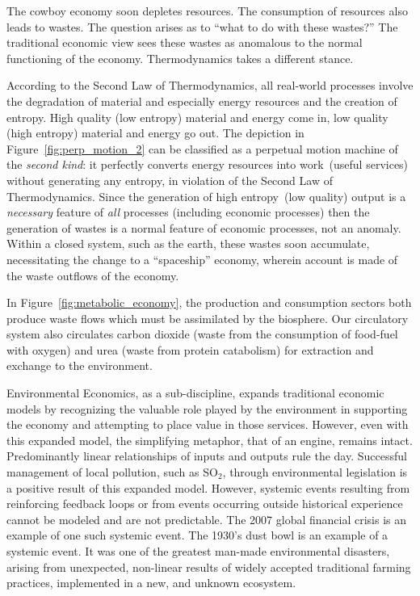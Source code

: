 The cowboy economy soon depletes resources.
The consumption of resources also leads to wastes.
The question arises as to ``what to do with these wastes?''
The traditional economic view sees these wastes as
anomalous to the normal functioning of the economy.\cite{Ayres1969}
Thermodynamics takes a different stance.

According to the Second Law of Thermodynamics,
all real-world processes involve the degradation
of material and especially energy resources
and the creation of entropy.
High quality (low entropy) material and energy come in,
low quality (high entropy) material and energy go out.
The depiction in Figure~\ref{fig:perp_motion_2} 
can be classified as a perpetual motion machine
of the \emph{second kind}:
it perfectly converts energy resources into 
work~(useful services) without generating
any entropy,
in violation of the Second Law of Thermodynamics.
Since the generation of high entropy~(low quality)
output is a \emph{necessary} feature of \emph{all} processes 
(including economic processes)
then the generation of wastes is a normal feature of
economic processes,
not an anomaly.
Within a closed system, such as the earth,
these wastes soon accumulate,
necessitating the change to a ``spaceship'' economy,
wherein account is made of the waste outflows of
the economy.

In Figure~\ref{fig:metabolic_economy},
the production and consumption sectors both produce
waste flows which must be assimilated by the biosphere.
Our circulatory system also circulates carbon dioxide
(waste from the consumption of food-fuel with oxygen)
and urea (waste from protein catabolism) for extraction
and exchange to the environment.

Environmental Economics, as a sub-discipline, 
expands traditional economic models by recognizing the
valuable role played by the environment in supporting the 
economy and attempting to place value in those services.
However, even with this expanded model, 
the simplifying metaphor,
that of an engine,
remains intact. 
Predominantly linear relationships of inputs and outputs rule the day. 
Successful management of  local pollution, such as SO$_2$, 
through environmental legislation
is a positive result of this expanded model.
However, systemic events resulting from reinforcing feedback loops 
or from events occurring outside historical experience 
cannot be modeled and are not predictable. 
The 2007 global financial crisis is an example of one such systemic event.\cite{Economist2010}
The 1930's dust bowl is an example of a systemic event. 
It was one of the greatest man-made environmental disasters, 
arising from unexpected, non-linear 
results of widely accepted traditional farming practices, 
implemented in a new, and unknown ecosystem.\cite{Lockertz1978} 

